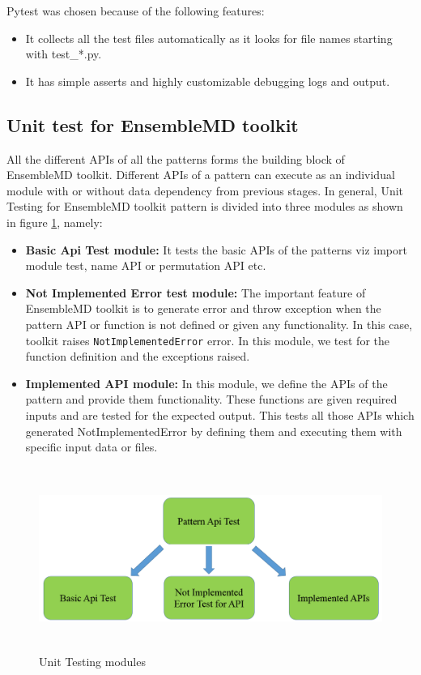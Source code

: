\documentclass[10pt]{ruthesis}
\begin{document}
Pytest was chosen because of the following features:
\begin{itemize}
\item It collects all the test files automatically as it looks for file names starting with test\_*.py.
\item It has simple asserts and highly customizable debugging logs and output.
\end{itemize}

\subsection{Unit test for EnsembleMD toolkit}
All the different APIs of all the patterns forms the building block of EnsembleMD toolkit. Different APIs of a pattern can execute as an individual module with or without data dependency from previous stages. In general, Unit Testing for EnsembleMD toolkit pattern is divided into three modules as shown in figure \ref{fig:ut}, namely: 

\begin{itemize}
\item \textbf{Basic Api Test module:} It tests the basic APIs of the patterns viz import module test, name API or permutation API etc.
\item \textbf{Not Implemented Error test module:} The important feature of EnsembleMD toolkit is to generate error and throw exception when the pattern API or function is not defined or given any functionality. In this case, toolkit raises \texttt{NotImplementedError} error. In this module, we test for the function definition and the exceptions raised. 
\item \textbf{Implemented API module:} In this module, we define the APIs of the pattern and provide them functionality. These functions are given required inputs and are tested for the expected output. This tests all those APIs which generated NotImplementedError by defining them and executing them with specific input data or files.
\end{itemize}

\begin{figure}
  \centering
  \includegraphics[width=17cm,height=6cm]{ut.png}
  \caption{Unit Testing modules}
  \label{fig:ut}
\end{figure}
\end{document}
